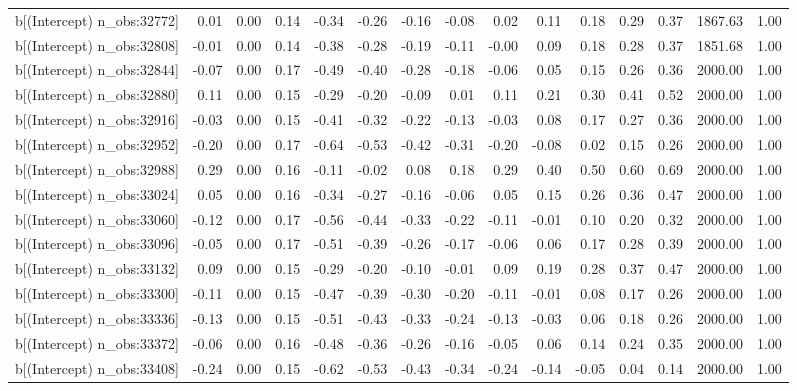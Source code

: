 \begin{table}[ht]
\begin{tabular}{rrrrrrrrrrrrrrr}
  b[(Intercept) n\_obs:32772] & 0.01 & 0.00 & 0.14 & -0.34 & -0.26 & -0.16 & -0.08 & 0.02 & 0.11 & 0.18 & 0.29 & 0.37 & 1867.63 & 1.00 \\ 
  b[(Intercept) n\_obs:32808] & -0.01 & 0.00 & 0.14 & -0.38 & -0.28 & -0.19 & -0.11 & -0.00 & 0.09 & 0.18 & 0.28 & 0.37 & 1851.68 & 1.00 \\ 
  b[(Intercept) n\_obs:32844] & -0.07 & 0.00 & 0.17 & -0.49 & -0.40 & -0.28 & -0.18 & -0.06 & 0.05 & 0.15 & 0.26 & 0.36 & 2000.00 & 1.00 \\ 
  b[(Intercept) n\_obs:32880] & 0.11 & 0.00 & 0.15 & -0.29 & -0.20 & -0.09 & 0.01 & 0.11 & 0.21 & 0.30 & 0.41 & 0.52 & 2000.00 & 1.00 \\ 
  b[(Intercept) n\_obs:32916] & -0.03 & 0.00 & 0.15 & -0.41 & -0.32 & -0.22 & -0.13 & -0.03 & 0.08 & 0.17 & 0.27 & 0.36 & 2000.00 & 1.00 \\ 
  b[(Intercept) n\_obs:32952] & -0.20 & 0.00 & 0.17 & -0.64 & -0.53 & -0.42 & -0.31 & -0.20 & -0.08 & 0.02 & 0.15 & 0.26 & 2000.00 & 1.00 \\ 
  b[(Intercept) n\_obs:32988] & 0.29 & 0.00 & 0.16 & -0.11 & -0.02 & 0.08 & 0.18 & 0.29 & 0.40 & 0.50 & 0.60 & 0.69 & 2000.00 & 1.00 \\ 
  b[(Intercept) n\_obs:33024] & 0.05 & 0.00 & 0.16 & -0.34 & -0.27 & -0.16 & -0.06 & 0.05 & 0.15 & 0.26 & 0.36 & 0.47 & 2000.00 & 1.00 \\ 
  b[(Intercept) n\_obs:33060] & -0.12 & 0.00 & 0.17 & -0.56 & -0.44 & -0.33 & -0.22 & -0.11 & -0.01 & 0.10 & 0.20 & 0.32 & 2000.00 & 1.00 \\ 
  b[(Intercept) n\_obs:33096] & -0.05 & 0.00 & 0.17 & -0.51 & -0.39 & -0.26 & -0.17 & -0.06 & 0.06 & 0.17 & 0.28 & 0.39 & 2000.00 & 1.00 \\ 
  b[(Intercept) n\_obs:33132] & 0.09 & 0.00 & 0.15 & -0.29 & -0.20 & -0.10 & -0.01 & 0.09 & 0.19 & 0.28 & 0.37 & 0.47 & 2000.00 & 1.00 \\ 
  b[(Intercept) n\_obs:33300] & -0.11 & 0.00 & 0.15 & -0.47 & -0.39 & -0.30 & -0.20 & -0.11 & -0.01 & 0.08 & 0.17 & 0.26 & 2000.00 & 1.00 \\ 
  b[(Intercept) n\_obs:33336] & -0.13 & 0.00 & 0.15 & -0.51 & -0.43 & -0.33 & -0.24 & -0.13 & -0.03 & 0.06 & 0.18 & 0.26 & 2000.00 & 1.00 \\ 
  b[(Intercept) n\_obs:33372] & -0.06 & 0.00 & 0.16 & -0.48 & -0.36 & -0.26 & -0.16 & -0.05 & 0.06 & 0.14 & 0.24 & 0.35 & 2000.00 & 1.00 \\ 
  b[(Intercept) n\_obs:33408] & -0.24 & 0.00 & 0.15 & -0.62 & -0.53 & -0.43 & -0.34 & -0.24 & -0.14 & -0.05 & 0.04 & 0.14 & 2000.00 & 1.00 \\ 

\end{tabular}
\end{table}
